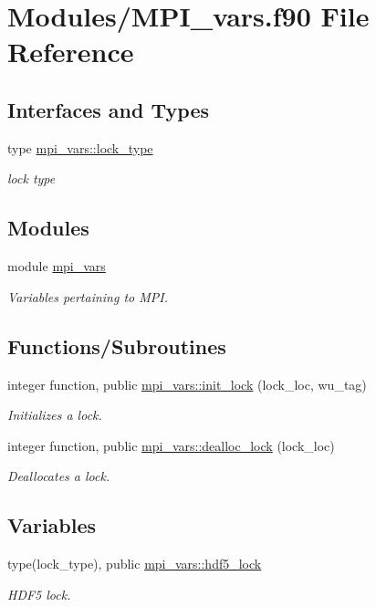 \hypertarget{MPI__vars_8f90}{}\section{Modules/\+M\+P\+I\+\_\+vars.f90 File Reference}
\label{MPI__vars_8f90}
\subsection*{Interfaces and Types}
\begin{DoxyCompactItemize}
\item 
type \hyperlink{structmpi__vars_1_1lock__type}{mpi\+\_\+vars\+::lock\+\_\+type}
\begin{DoxyCompactList}\small\item\em lock type \end{DoxyCompactList}\end{DoxyCompactItemize}
\subsection*{Modules}
\begin{DoxyCompactItemize}
\item 
module \hyperlink{namespacempi__vars}{mpi\+\_\+vars}
\begin{DoxyCompactList}\small\item\em Variables pertaining to M\+PI. \end{DoxyCompactList}\end{DoxyCompactItemize}
\subsection*{Functions/\+Subroutines}
\begin{DoxyCompactItemize}
\item 
integer function, public \hyperlink{namespacempi__vars_ab38aeec20e567cf6f272587890ead066}{mpi\+\_\+vars\+::init\+\_\+lock} (lock\+\_\+loc, wu\+\_\+tag)
\begin{DoxyCompactList}\small\item\em Initializes a lock. \end{DoxyCompactList}\item 
integer function, public \hyperlink{namespacempi__vars_af03c942b5f1c980adf9e1b2ba3f4bd58}{mpi\+\_\+vars\+::dealloc\+\_\+lock} (lock\+\_\+loc)
\begin{DoxyCompactList}\small\item\em Deallocates a lock. \end{DoxyCompactList}\end{DoxyCompactItemize}
\subsection*{Variables}
\begin{DoxyCompactItemize}
\item 
type(lock\+\_\+type), public \hyperlink{namespacempi__vars_a834e19cd963fef0ad150e22aa3c56d53}{mpi\+\_\+vars\+::hdf5\+\_\+lock}
\begin{DoxyCompactList}\small\item\em H\+D\+F5 lock. \end{DoxyCompactList}\end{DoxyCompactItemize}
